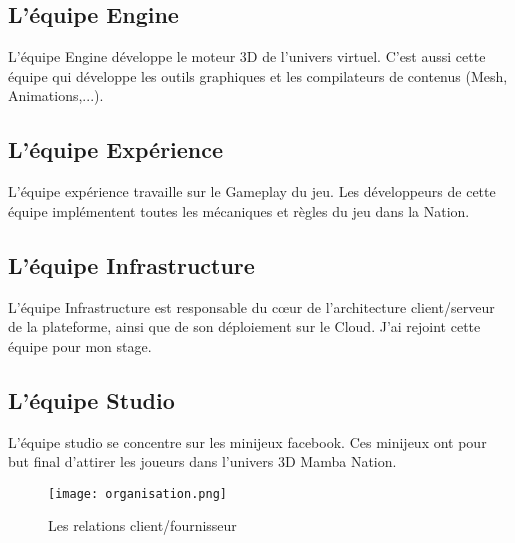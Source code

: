 \subsection{L'équipe Engine}
L'équipe Engine développe le moteur 3D de l'univers virtuel.
C'est aussi cette équipe qui développe les outils graphiques et les compilateurs
de contenus (Mesh, Animations,...).


\subsection{L'équipe Expérience}

L'équipe expérience travaille sur le Gameplay du jeu. Les développeurs de cette
équipe implémentent toutes les mécaniques et règles du jeu dans la Nation.

\subsection{L'équipe Infrastructure}
L'équipe Infrastructure est responsable du cœur de l'architecture client/serveur
de la plateforme, ainsi que de son déploiement sur le Cloud.
J'ai rejoint cette équipe pour mon stage.

\subsection{L'équipe Studio}

L'équipe studio se concentre sur les minijeux facebook. Ces minijeux ont pour
but final d'attirer les joueurs dans l'univers 3D Mamba Nation.


\begin{figure}[H]
  \begin{center}
    \texttt{[image: organisation.png]}   
  \end{center}
  \caption{Les relations client/fournisseur}
\end{figure}

